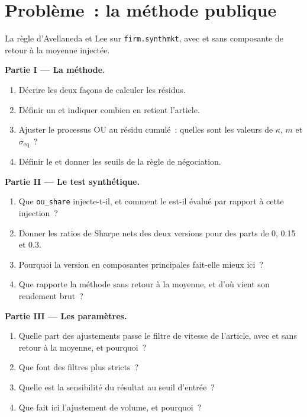 \section{Problème~: la méthode publique}

\begin{problem}\label{pb:s1:residual-and-principal-component-stat-arb:1}
La règle d'Avellaneda et Lee sur \texttt{firm.synthmkt}, avec et sans composante de retour à la moyenne injectée.

\medskip\noindent\textbf{Partie I --- La méthode.}
\begin{enumerate}
\item Décrire les deux façons de calculer les résidus.
\item Définir un  et indiquer combien en retient l'article.
\item Ajuster le processus OU au résidu cumulé~: quelles sont les valeurs de $\kappa$, $m$ et $\sigma_{\mathrm{eq}}$~?
\item Définir le  et donner les seuils de la règle de négociation.
\end{enumerate}

\medskip\noindent\textbf{Partie II --- Le test synthétique.}
\begin{enumerate}[resume]
\item Que \texttt{ou\_share} injecte-t-il, et comment le  est-il évalué par rapport à cette injection~?
\item Donner les ratios de Sharpe nets des deux versions pour des parts de 0, 0.15 et 0.3.
\item Pourquoi la version en composantes principales fait-elle mieux ici~?
\item Que rapporte la méthode sans retour à la moyenne, et d'où vient son rendement brut~?
\end{enumerate}

\medskip\noindent\textbf{Partie III --- Les paramètres.}
\begin{enumerate}[resume]
\item Quelle part des ajustements passe le filtre de vitesse de l'article, avec et sans retour à la moyenne, et pourquoi~?
\item Que font des filtres plus stricts~?
\item Quelle est la sensibilité du résultat au seuil d'entrée~?
\item Que fait ici l'ajustement de volume, et pourquoi~?
\end{enumerate}


\end{problem}

